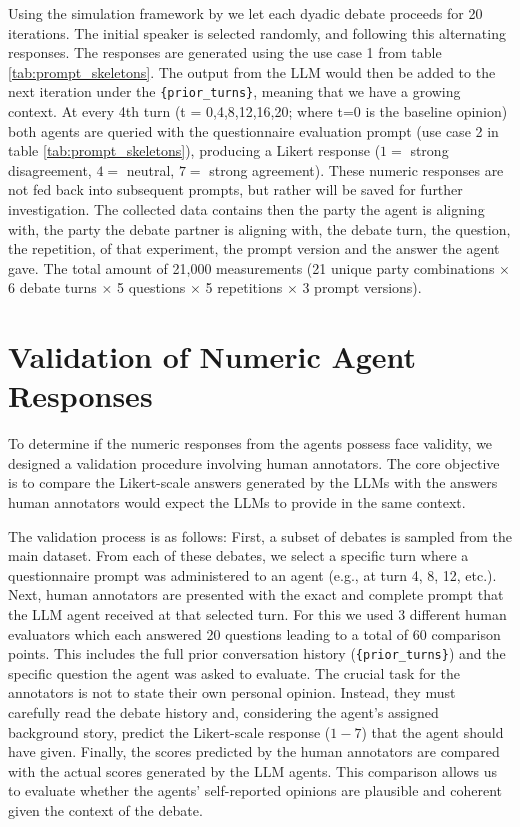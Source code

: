Using the simulation framework by \cite{neuberger2024sauce} we let each dyadic debate proceeds for 20 iterations. The initial speaker is selected randomly, and following this alternating responses. The responses are generated using the use case 1 from table \ref{tab:prompt_skeletons}. The output from the LLM would then be added to the next iteration under the \texttt{\{prior\_turns\}}, meaning that we have a growing context. At every 4th turn (t = 0,4,8,12,16,20; where t=0 is the baseline opinion) both agents are queried with the questionnaire evaluation prompt (use case 2 in table \ref{tab:prompt_skeletons}), producing a Likert response (\(1=\) strong disagreement, \(4=\) neutral, \(7=\) strong agreement). These numeric responses are not fed back into subsequent prompts, but rather will be saved for further investigation. The collected data contains then the party the agent is aligning with, the party the debate partner is aligning with, the debate turn, the question, the repetition, of that experiment, the prompt version and the answer the agent gave. The total amount of 21,000 measurements (21 unique party combinations $\times$ 6 debate turns $\times$ 5 questions $\times$ 5 repetitions $\times$ 3 prompt versions).


\section{Validation of Numeric Agent Responses}
To determine if the numeric responses from the agents possess face validity, we designed a validation procedure involving human annotators. The core objective is to compare the Likert-scale answers generated by the LLMs with the answers human annotators would expect the LLMs to provide in the same context.

The validation process is as follows:
First, a subset of debates is sampled from the main dataset. From each of these debates, we select a specific turn where a questionnaire prompt was administered to an agent (e.g., at turn 4, 8, 12, etc.). Next, human annotators are presented with the exact and complete prompt that the LLM agent received at that selected turn. For this we used 3 different human evaluators which each answered 20 questions leading to a total of 60 comparison points. This includes the full prior conversation history (\texttt{\{prior\_turns\}}) and the specific question the agent was asked to evaluate. The crucial task for the annotators is not to state their own personal opinion. Instead, they must carefully read the debate history and, considering the agent's assigned background story, predict the Likert-scale response ($1-7$) that the agent should have given. Finally, the scores predicted by the human annotators are compared with the actual scores generated by the LLM agents. This comparison allows us to evaluate whether the agents' self-reported opinions are plausible and coherent given the context of the debate.

